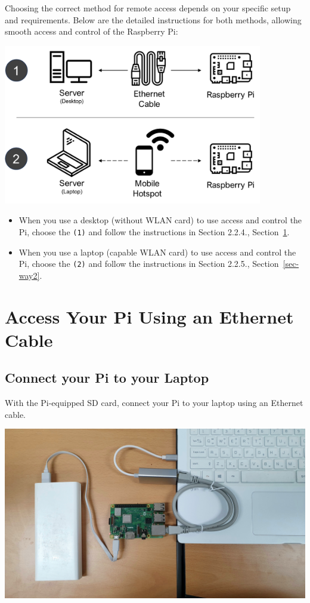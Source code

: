 \documentclass[
  letterpaper,
]{scrbook}
\begin{document}
Choosing the correct method for remote access depends on your specific
setup and requirements. Below are the detailed instructions for both
methods, allowing smooth access and control of the Raspberry Pi:

\includegraphics[width=0.85\textwidth,height=\textheight]{content/material/ch2/choose_remote.png}

\begin{itemize}
\item
  When you use a desktop (without WLAN card) to use access and control
  the Pi, choose the \texttt{(1)} and follow the instructions in Section
  2.2.4., Section~\ref{sec-way1}.
\item
  When you use a laptop (capable WLAN card) to use access and control
  the Pi, choose the \texttt{(2)} and follow the instructions in Section
  2.2.5., Section~\ref{sec-way2}.
\end{itemize}

\section{Access Your Pi Using an Ethernet Cable}\label{sec-way1}

\subsection{Connect your Pi to your
Laptop}\label{connect-your-pi-to-your-laptop}

With the Pi-equipped SD card, connect your Pi to your laptop using an
Ethernet cable.

\includegraphics{content/material/ch2/connect_pi.jpg}
\end{document}
